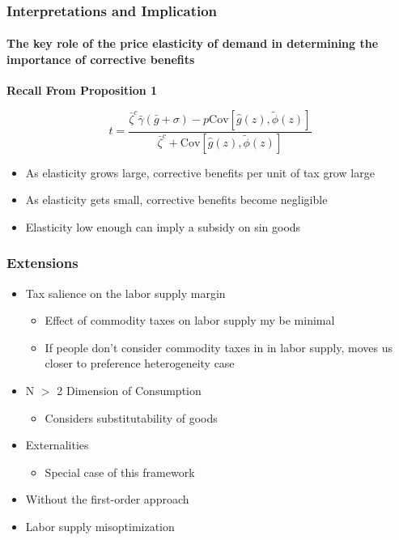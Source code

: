 \documentclass{beamer}
\newcommand{\Cov}{\mathrm{Cov}}
\begin{document}
\begin{frame}
\frametitle{Interpretations and Implication}
\framesubtitle{The key role of the price elasticity of demand in determining the importance of corrective benefits}

\textbf{Recall From Proposition 1} 

$$ t = \frac{\bar{\zeta}^c \bar{\gamma} (\bar{g}  + \sigma) - p\Cov \left[ \hat{g}(z),\tilde{\phi}(z) \right]}{\bar{\zeta}^c + \Cov \left[\hat{g}(z), \tilde{\phi}(z) \right]}$$ 

\begin{itemize}
	\item As elasticity grows large, corrective benefits per unit of tax grow large
	\item As elasticity gets small, corrective benefits become negligible
	\item Elasticity low enough can imply a subsidy on sin goods
\end{itemize}


\end{frame}




\begin{frame}
\frametitle{Extensions} 
\begin{itemize}
	\item Tax salience on the labor supply margin 
	\begin{itemize}
		\item Effect of commodity taxes on labor supply my be minimal 
		\item If people don't consider commodity taxes in in labor supply, moves us closer to preference heterogeneity case
	\end{itemize}
	\item N $>$ 2 Dimension of Consumption 
	\begin{itemize}
		\item Considers substitutability of goods
	\end{itemize}
	\item Externalities 
	\begin{itemize}
		\item Special case of this framework 
	\end{itemize}
	\item Without the first-order approach
	\item Labor supply misoptimization 
\end{itemize}

\end{frame}
\end{document}
